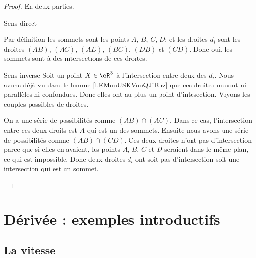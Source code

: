 \begin{proof}
    En deux parties.
    \begin{subproof}
    \item[Sens direct]
        
    Par définition les sommets sont les points \( A \), \( B\), \( C\), \( D\); et les droites \( d_i\) sont les droites \( (AB)\), \( (AC)\), \( (AD)\), \( (BC)\), \( (DB)\) et \( (CD)\). Donc oui, les sommets sont à des intersections de ces droites.

    \item[Sens inverse]
    Soit un point \( X\in \eR^3\) à l'intersection entre deux des \( d_i\). Nous avons déjà vu dans le lemme \ref{LEMooUSKVooQJiBuz} que ces droites ne sont ni parallèles ni confondues. Donc elles ont au plus un point d'intesection. Voyons les couples possibles de droites.

    On a une série de possibilités comme \( (AB)\cap(AC)\). Dans ce cas, l'intersection entre ces deux droits est \( A\) qui est un des sommets. Ensuite nous avons une série de possibilités comme \( (AB)\cap (CD)\). Ces deux droites n'ont pas d'intersection parce que si elles en avaient, les points \( A\), \( B\), \( C\) et \( D\) seraient dans le même plan, ce qui est impossible.
    Donc deux droites \( d_i\) ont soit pas d'intersection soit une intersection qui est un sommet.
    \end{subproof}
\end{proof}


\section{Dérivée : exemples introductifs}

\subsection{La vitesse}

